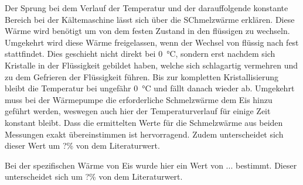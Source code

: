 	Der Sprung bei dem Verlauf der Temperatur und der darauffolgende konstante Bereich bei der Kältemaschine lässt sich über die SChmelzwärme erklären.
	Diese Wärme wird benötigt um von dem festen Zustand in den flüssigen zu wechseln.
	Umgekehrt wird diese Wärme freigelassen, wenn der Wechsel von flüssig nach fest stattfindet.
	Dies geschieht nicht direkt bei \SI{0}{\celsius}, sondern erst nachdem sich Kristalle in der Flüssigkeit gebildet haben, welche sich schlagartig vermehren und zu dem Gefrieren der Flüssigkeit führen.
	Bis zur kompletten Kristallisierung bleibt die Temperatur bei ungefähr \SI{0}{\celsius} und fällt danach wieder ab.
	Umgekehrt muss bei der Wärmepumpe die erforderliche Schmelzwärme dem Eis hinzu geführt werden, weswegen auch hier der Temperaturverlauf für einige Zeit konstant bleibt. 
	Dass die ermittelten Werte für die Schmelzwärme aus beiden Messungen exakt übereinstimmen ist hervorragend.
	Zudem unterscheidet sich dieser Wert um ?\% von dem Literaturwert. %
	
	Bei der spezifischen Wärme von Eis wurde hier ein Wert von ... bestimmt. %
	Dieser unterscheidet sich um ?\% von dem Literaturwert. %